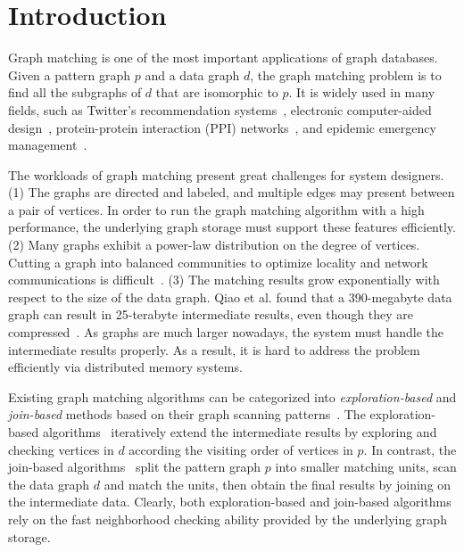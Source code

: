 \section{Introduction}
Graph matching is one of the most important applications of graph databases.
Given a pattern graph $p$ and a data graph $d$, the graph matching problem is to find all the subgraphs of $d$ that are isomorphic to $p$.
It is widely used in many fields,
such as Twitter's recommendation systems~\cite{DBLP:journals/pvldb/GuptaSGGZLL14,DBLP:journals/pvldb/SharmaJBLL16},
electronic computer-aided design~\cite{DBLP:conf/dac/OhlrichEGS93},
protein-protein interaction (PPI) networks~\cite{milenkovic2008uncovering},
and epidemic emergency management~\cite{info:doi/10.2196/26836}.

The workloads of graph matching present great challenges for system designers.
(1) The graphs are directed and labeled, and multiple edges may present between a pair of vertices.
In order to run the graph matching algorithm with a high performance, the underlying graph storage must support these features efficiently.
(2) Many graphs exhibit a power-law distribution on the degree of vertices.
Cutting a graph into balanced communities to optimize locality and network communications is difficult~\cite{DBLP:journals/im/LeskovecLDM09}.
(3) The matching results grow exponentially with respect to the size of the data graph.
Qiao et al\@. found that a 390-megabyte data graph can result in 25-terabyte intermediate results, even though they are compressed~\cite{DBLP:journals/pvldb/QiaoZC17}.
As graphs are much larger nowadays, the system must handle the intermediate results properly.
As a result, it is hard to address the problem efficiently via distributed memory systems.

Existing graph matching algorithms can be categorized into \emph{exploration-based} and \emph{join-based} methods based on their graph scanning patterns~\cite{DBLP:journals/pvldb/SunSC0H20}.
The exploration-based algorithms~\cite{DBLP:journals/jacm/Ullmann76,DBLP:journals/pami/CordellaFSV04,DBLP:journals/pvldb/ShangZLY08,DBLP:conf/sigmod/HeS08,DBLP:conf/sigmod/HanLL13,DBLP:journals/pvldb/ZhaoH10,DBLP:journals/pvldb/LeeHKL12}
iteratively extend the intermediate results by exploring and checking vertices in $d$ according the visiting order of vertices in $p$.
In contrast, the join-based algorithms~\cite{DBLP:journals/pvldb/LaiQLC15,DBLP:journals/pvldb/QiaoZC17,DBLP:journals/pvldb/SunWWSL12,DBLP:journals/pvldb/MhedhbiS19,DBLP:journals/pvldb/LinMPS16,DBLP:journals/pvldb/AmmarMSJ18} split the pattern graph $p$ into smaller matching units, scan the data graph $d$ and match the units, then obtain the final results by joining on the intermediate data.
Clearly, both exploration-based and join-based algorithms rely on the fast neighborhood checking ability provided by the underlying graph storage.

